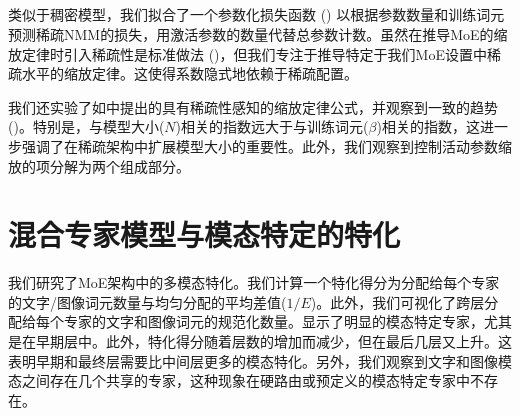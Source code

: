 \begin{table}[htb]
    \centering
    \setlength{\tabcolsep}{16pt} %
    \renewcommand{\arraystretch}{1} %
    \caption{\textbf{缩放律敏感性。} 我们报告了使用100次自举法迭代后的均值和标准差。}
    \label{tab:scaling_laws_sensitivity}
\end{table}


\subsection{}
\label{app:scaling_laws_moes}

类似于稠密模型，我们拟合了一个参数化损失函数 () 以根据参数数量和训练词元预测稀疏NMM的损失，用激活参数的数量代替总参数计数。虽然在推导MoE的缩放定律时引入稀疏性是标准做法 (\citep{wangscalingmoe,krajewski2024scalingmoe,abnar2025parameters})，但我们专注于推导特定于我们MoE设置中稀疏水平的缩放定律。这使得系数隐式地依赖于稀疏配置。 

我们还实验了如\citep{abnar2025parameters}中提出的具有稀疏性感知的缩放定律公式，并观察到一致的趋势()。特别是，与模型大小($N$)相关的指数远大于与训练词元($\beta$)相关的指数，这进一步强调了在稀疏架构中扩展模型大小的重要性。此外，我们观察到控制活动参数缩放的项分解为两个组成部分。





\section{混合专家模型与模态特定的特化}
\label{app:moes}





我们研究了MoE架构中的多模态特化。我们计算一个特化得分为分配给每个专家的文字/图像词元数量与均匀分配的平均差值($1/E$)。此外，我们可视化了跨层分配给每个专家的文字和图像词元的规范化数量。显示了明显的模态特定专家，尤其是在早期层中。此外，特化得分随着层数的增加而减少，但在最后几层又上升。这表明早期和最终层需要比中间层更多的模态特化。另外，我们观察到文字和图像模态之间存在几个共享的专家，这种现象在硬路由或预定义的模态特定专家中不存在。


